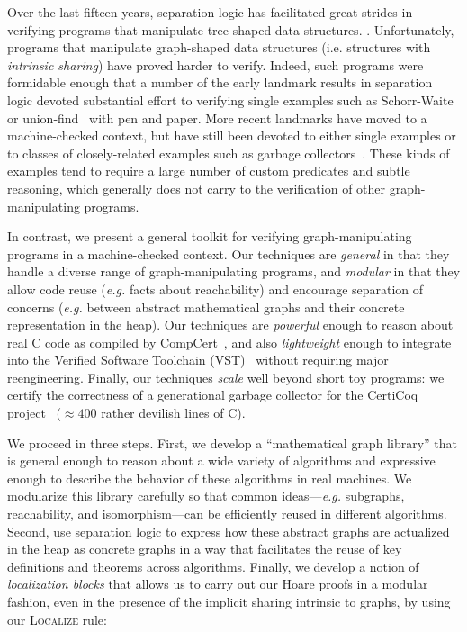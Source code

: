 Over the last fifteen years, separation logic has facilitated great strides
in verifying programs that manipulate tree-shaped data structures.
\citep{berdine:smallfoot,chin:hipsleek,jacobs:verifast,
chlipala:bedrock,bengtson:charge,appel:programlogics}.
Unfortunately, programs that manipulate graph-shaped data structures
(i.e. structures with \emph{intrinsic sharing}) have proved harder to verify.
Indeed, such programs were formidable enough that a number of the early
landmark results in separation logic devoted substantial effort to verifying
single examples such as Schorr-Waite~\cite{hongseok:phd} or
union-find~\cite{neelthesis} with pen and paper.
More recent landmarks have moved to a machine-checked context, but have still
been devoted to either single examples or to classes of closely-related examples
such as garbage collectors~{\color{red}\cite{blah,cakemlgc}}.
These kinds of examples tend to require a large number
of custom predicates and subtle reasoning, which generally does not carry 
to the verification of other graph-manipulating programs.

In contrast, we present a general toolkit for verifying graph-manipulating programs in a
machine-checked context. Our techniques are \emph{general} in that they handle a diverse
range of graph-manipulating programs, and \emph{modular} in that they allow code
reuse (\emph{e.g.} facts about reachability) and encourage separation of concerns
(\emph{e.g.} between abstract mathematical graphs and their concrete representation
in the heap).
Our techniques are \emph{powerful} enough to reason about real C code as compiled by
CompCert~\cite{leroy:compcert}, and also
\emph{lightweight} enough to integrate into the Verified
Software Toolchain (VST)~\cite{appel:programlogics} without requiring major reengineering.
Finally, our techniques \emph{scale} well beyond short toy programs: we certify the
correctness of a generational garbage collector for the CertiCoq
project~{\color{red}\cite{certicoqwebsite}} ($\approx400$ rather devilish lines of C).

We proceed in three steps. First, we develop a ``mathematical graph library'' that is general enough to reason about a wide variety of algorithms and expressive enough to describe the behavior of these algorithms in real machines.  We modularize this library carefully so that common ideas---\emph{e.g.} subgraphs, reachability, and isomorphism---can be efficiently reused 
in different algorithms.  Second, use separation logic to express how these abstract graphs 
are actualized in the heap as concrete graphs in a way that facilitates the reuse of key definitions and theorems across algorithms.  Finally, we develop a notion of \emph{localization blocks} that
allows us to carry out our Hoare proofs in a modular fashion, even in the presence of the 
implicit sharing intrinsic to graphs, by using our \textsc{Localize} rule:

